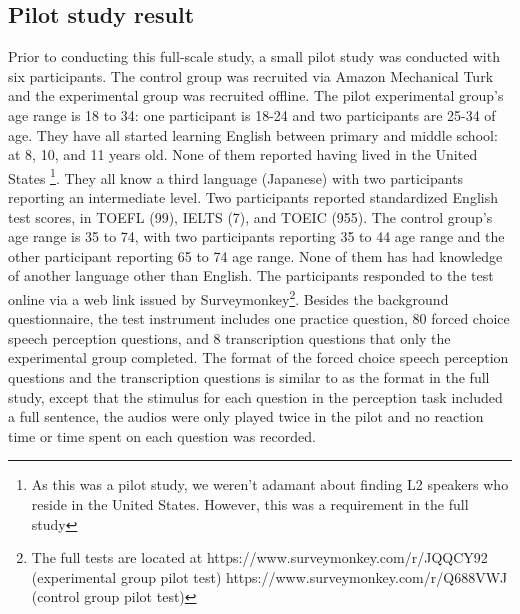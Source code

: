 \documentclass[a4paper]{article}
\begin{document}
\subsection{Pilot study result}


Prior to conducting this full-scale study, a small pilot study was conducted with six participants. The control group was recruited via Amazon Mechanical Turk and the experimental group was recruited offline. The pilot experimental group's age range is 18 to 34: one participant is 18-24 and two participants are 25-34 of age. They have all started learning English between primary and middle school: at 8, 10, and 11 years old. None of them reported having lived in the United States \footnote{As this was a pilot study, we weren't adamant about finding L2 speakers who reside in the United States. However, this was a requirement in the full study}. They all know a third language (Japanese) with two participants reporting an intermediate level. Two participants reported standardized English test scores, in TOEFL (99), IELTS (7), and TOEIC (955). The control group's age range is 35 to 74, with two participants reporting 35 to 44 age range and the other participant reporting 65 to 74 age range. None of them has had knowledge of another language other than English. The participants responded to the test online via a web link issued by Surveymonkey\footnote{The full tests are located at https://www.surveymonkey.com/r/JQQCY92 (experimental group pilot test) https://www.surveymonkey.com/r/Q688VWJ (control group pilot test)}. Besides the background questionnaire, the test instrument includes one practice question, 80 forced choice speech perception questions, and 8 transcription questions that only the experimental group completed. The format of the forced choice speech perception questions and the transcription questions is similar to as the format in the full study, except that the stimulus for each question in the perception task included a full sentence, the audios were only played twice in the pilot and no reaction time or time spent on each question was recorded.
\end{document}
